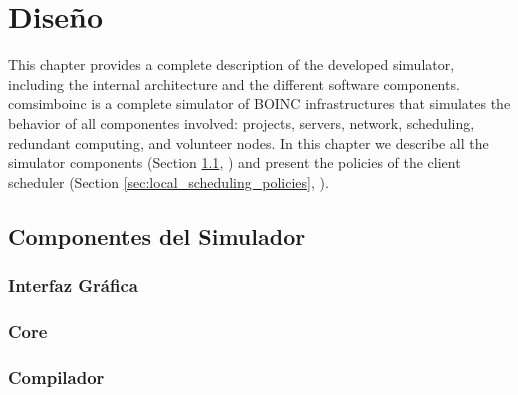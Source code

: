 \chead[]{}
\renewcommand{\headrulewidth}{0.5pt}

\lfoot[]{}
\cfoot[]{}
\rfoot[]{}
\renewcommand{\footrulewidth}{0pt}

\chapter{Diseño}
\label{ch:design}

This chapter provides a complete description of the developed simulator, including the internal architecture and the different software components. \gls{comsimboinc} is a complete simulator of BOINC infrastructures that simulates the behavior of all componentes involved: projects,  servers, network, \gls{scheduling}, redundant computing, and volunteer nodes. In this chapter we describe all the simulator components (Section \ref{sec:simulator_components}, \textit{}) and present the policies of the client scheduler (Section \ref{sec:local_scheduling_policies}, \textit{}).


\section{Componentes del Simulador}
\label{sec:simulator_components}


\subsection{Interfaz Gráfica}


\subsection{Core}


\subsection{Compilador}


